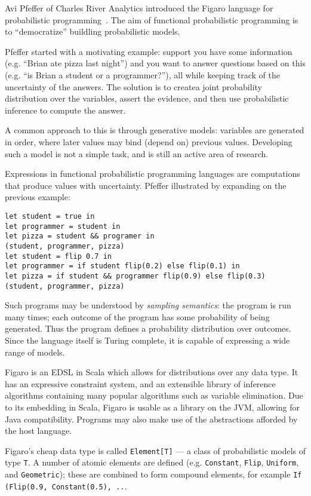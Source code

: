 \documentclass{jfp1}
\begin{document}

Avi Pfeffer of Charles River Analytics introduced the Figaro language
for probabilistic programming~\cite{Pfeffer:2009:Figaro}. The aim of
functional probabilistic programming is to ``democratize'' buildling
probabilistic models.

Pfeffer started with a motivating example: support you have some
information (e.g. ``Brian ate pizza last night'') and you want to
answer questions based on this (e.g. ``is Brian a student or a
programmer?''), all while keeping track of the uncertainty of the
answers. The solution is to createa joint probability distribution
over the variables, assert the evidence, and then use probabilistic
inference to compute the answer.

A common approach to this is through generative models: variables are
generated in order, where later values may bind (depend on) previous
values. Developing such a model is not a simple task, and is still an
active area of research.

Expressions in functional probabilistic programming languages are
computations that produce values with uncertainty. Pfeffer illustrated
by expanding on the previous example:

\begin{verbatim}
let student = true in
let programmer = student in
let pizza = student && programer in
(student, programmer, pizza)
let student = flip 0.7 in
let programmer = if student flip(0.2) else flip(0.1) in
let pizza = if student && programmer flip(0.9) else flip(0.3)
(student, programmer, pizza)
\end{verbatim}

Such programs may be understood by \textit{sampling semantics}:
the program is run many times; each outcome of the program has
some probability of being generated. Thus the program defines a
probability distribution over outcomes. Since the language itself is
Turing complete, it is capable of expressing a wide range of models.

Figaro is an EDSL in Scala which allows for distributions over any
data type. It has an expressive constraint system, and an extensible
library of inference algorithms containing many popular algorithms
such as variable elimination. Due to its embedding in Scala, Figaro
is usable as a library on the JVM, allowing for Java compatibility.
Programs may also make use of the abstractions afforded
by the host language.

Figaro's cheap data type is called \texttt{Element[T]} --- a class of
probabilistic models of type \texttt{T}. A number of atomic elements
are defined (e.g. \texttt{Constant}, \texttt{Flip}, \texttt{Uniform}, and
\texttt{Geometric}); these are combined to form compound elements, 
for example \texttt{If (Flip(0.9, Constant(0.5), ..}.
\end{document}
